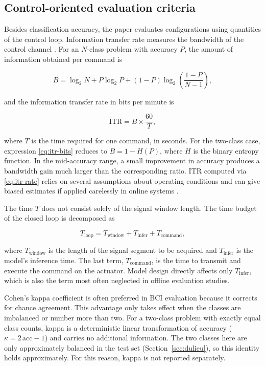 \subsection{Control-oriented evaluation criteria}
\label{sec:rangbuoc}

Besides classification accuracy, the paper evaluates configurations
using quantities of the control loop. Information transfer rate
measures the bandwidth of the control channel \cite{wolpaw2002brain}.
For an $N$-class problem with accuracy $P$, the amount of information
obtained per command is

\begin{equation}
\label{eq:itr-bits}
B = \log_2 N + P\log_2 P + (1-P)\log_2\!\left(\frac{1-P}{N-1}\right),
\end{equation}

and the information transfer rate in bits per minute is

\begin{equation}
\label{eq:itr-rate}
\mathrm{ITR} = B \times \frac{60}{T},
\end{equation}

where $T$ is the time required for one command, in seconds. For the
two-class case, expression \eqref{eq:itr-bits} reduces to
$B = 1 - H(P)$, where $H$ is the binary entropy function. In the
mid-accuracy range, a small improvement in accuracy produces a
bandwidth gain much larger than the corresponding ratio. ITR computed
via \eqref{eq:itr-rate} relies on several assumptions about operating
conditions and can give biased estimates if applied carelessly in
online systems \cite{yuan2013study}.

The time $T$ does not consist solely of the signal window length. The
time budget of the closed loop is decomposed as

\begin{equation}
\label{eq:latency}
T_{\mathrm{loop}} = T_{\mathrm{window}} + T_{\mathrm{infer}}
                  + T_{\mathrm{command}},
\end{equation}

where $T_{\mathrm{window}}$ is the length of the signal segment to be acquired and
$T_{\mathrm{infer}}$ is the model's inference time. The last term,
$T_{\mathrm{command}}$, is the time to transmit and execute the command on
the actuator. Model design directly affects only $T_{\mathrm{infer}}$,
which is also the term most often neglected in offline evaluation studies.

Cohen's kappa coefficient is often preferred in BCI evaluation
because it corrects for chance agreement. This advantage only takes
effect when the classes are imbalanced or number more than two. For a
two-class problem with exactly equal class counts, kappa is a
deterministic linear transformation of accuracy
($\kappa = 2\,\mathrm{acc} - 1$) and carries no additional
information. The two classes here are only approximately balanced in
the test set (Section~\ref{sec:dulieu}), so this identity holds
approximately. For this reason, kappa is not reported separately.

